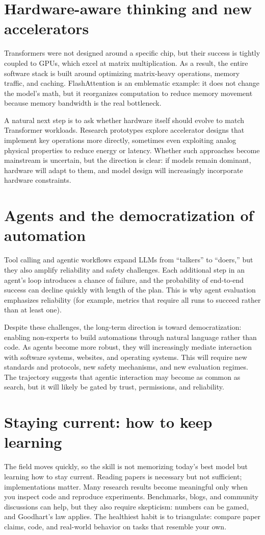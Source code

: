 \section{Hardware-aware thinking and new accelerators}
Transformers were not designed around a specific chip, but their success is tightly coupled to GPUs, which excel at matrix multiplication. As a result, the entire software stack is built around optimizing matrix-heavy operations, memory traffic, and caching. FlashAttention is an emblematic example: it does not change the model’s math, but it reorganizes computation to reduce memory movement because memory bandwidth is the real bottleneck.

A natural next step is to ask whether hardware itself should evolve to match Transformer workloads. Research prototypes explore accelerator designs that implement key operations more directly, sometimes even exploiting analog physical properties to reduce energy or latency. Whether such approaches become mainstream is uncertain, but the direction is clear: if models remain dominant, hardware will adapt to them, and model design will increasingly incorporate hardware constraints.

\section{Agents and the democratization of automation}
Tool calling and agentic workflows expand LLMs from “talkers” to “doers,” but they also amplify reliability and safety challenges. Each additional step in an agent’s loop introduces a chance of failure, and the probability of end-to-end success can decline quickly with length of the plan. This is why agent evaluation emphasizes reliability (for example, metrics that require all runs to succeed rather than at least one).

Despite these challenges, the long-term direction is toward democratization: enabling non-experts to build automations through natural language rather than code. As agents become more robust, they will increasingly mediate interaction with software systems, websites, and operating systems. This will require new standards and protocols, new safety mechanisms, and new evaluation regimes. The trajectory suggests that agentic interaction may become as common as search, but it will likely be gated by trust, permissions, and reliability.

\section{Staying current: how to keep learning}
The field moves quickly, so the skill is not memorizing today’s best model but learning how to stay current. Reading papers is necessary but not sufficient; implementations matter. Many research results become meaningful only when you inspect code and reproduce experiments. Benchmarks, blogs, and community discussions can help, but they also require skepticism: numbers can be gamed, and Goodhart’s law applies. The healthiest habit is to triangulate: compare paper claims, code, and real-world behavior on tasks that resemble your own.

